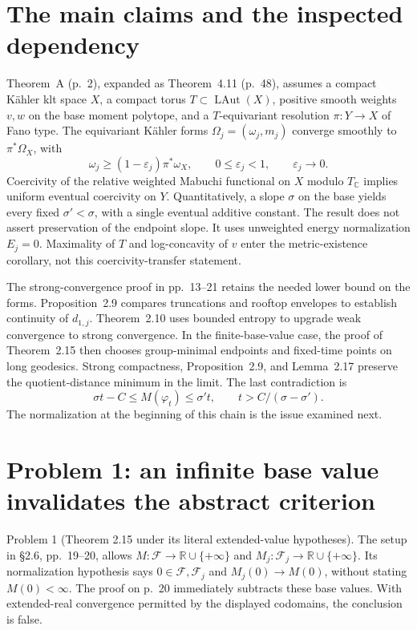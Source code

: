 \documentclass[10pt]{article}
\begin{document}
\section*{The main claims and the inspected dependency}
Theorem A (p. 2), expanded as Theorem 4.11 (p. 48), assumes a compact Kähler klt space \(X\), a compact torus \(T\subset\operatorname{LAut}(X)\), positive smooth weights \(v,w\) on the base moment polytope, and a \(T\)-equivariant resolution \(\pi:Y\to X\) of Fano type. The equivariant Kähler forms \(\Omega_j=(\omega_j,m_j)\) converge smoothly to \(\pi^*\Omega_X\), with \[\omega_j\ge(1-\varepsilon_j)\pi^*\omega_X,\qquad
 0\le\varepsilon_j<1,\qquad \varepsilon_j\longrightarrow0.\] Coercivity of the relative weighted Mabuchi functional on \(X\) modulo \(T_{\mathbb C}\) implies uniform eventual coercivity on \(Y\). Quantitatively, a slope \(\sigma\) on the base yields every fixed \(\sigma'<\sigma\), with a single eventual additive constant. The result does not assert preservation of the endpoint slope. It uses unweighted energy normalization \(E_j=0\). Maximality of \(T\) and log-concavity of \(v\) enter the metric-existence corollary, not this coercivity-transfer statement.\par
The strong-convergence proof in pp. 13–21 retains the needed lower bound on the forms. Proposition 2.9 compares truncations and rooftop envelopes to establish continuity of \(d_{1,j}\). Theorem 2.10 uses bounded entropy to upgrade weak convergence to strong convergence. In the finite-base-value case, the proof of Theorem 2.15 then chooses group-minimal endpoints and fixed-time points on long geodesics. Strong compactness, Proposition 2.9, and Lemma 2.17 preserve the quotient-distance minimum in the limit. The last contradiction is \[\sigma t-C\le M(\varphi_t)\le \sigma't,\qquad
 t>C/(\sigma-\sigma').\] The normalization at the beginning of this chain is the issue examined next.\par
\section*{Problem 1: an infinite base value invalidates the abstract criterion}
Problem 1 (Theorem 2.15 under its literal extended-value hypotheses).  The setup in §2.6, pp. 19–20, allows \(M:\mathcal F\to\mathbb R\cup\{+\infty\}\) and \(M_j:\mathcal F_j\to\mathbb R\cup\{+\infty\}\). Its normalization hypothesis says \(0\in\mathcal F,\mathcal F_j\) and \(M_j(0)\to M(0)\), without stating \(M(0)<\infty\). The proof on p. 20 immediately subtracts these base values. With extended-real convergence permitted by the displayed codomains, the conclusion is false.\par
\end{document}
